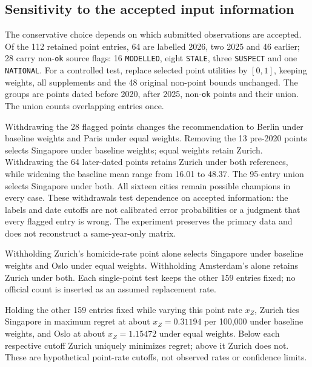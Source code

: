 \subsection{Sensitivity to the accepted input information}\label{sec:sourcepolicy}
The conservative choice depends on which submitted observations are accepted.
Of the 112 retained point entries, 64 are labelled 2026, two 2025 and 46 earlier;
28 carry non-\texttt{ok} source flags: 16 \texttt{MODELLED}, eight \texttt{STALE},
three \texttt{SUSPECT} and one \texttt{NATIONAL}.
For a controlled test, replace selected point utilities by $[0,1]$, keeping
weights, all supplements and the 48 original non-point bounds unchanged.
The groups are points dated before 2020, after 2025, non-\texttt{ok} points and
their union. The union counts overlapping entries once.



Withdrawing the 28 flagged points changes the recommendation to Berlin under
baseline weights and Paris under equal weights. Removing the 13 pre-2020 points
selects Singapore under baseline weights; equal weights retain Zurich.
Withdrawing the 64 later-dated points retains Zurich under both references,
while widening the baseline mean range from 16.01 to 48.37. The 95-entry union
selects Singapore under both. All sixteen cities remain possible champions
in every case. These withdrawals test dependence on accepted information:
the labels and date cutoffs are not calibrated error probabilities or a
judgment that every flagged entry is wrong. The experiment preserves the
primary data and does not reconstruct a same-year-only matrix.

Withholding Zurich's homicide-rate point alone selects Singapore under baseline
weights and Oslo under equal weights. Withholding Amsterdam's alone retains
Zurich under both. Each single-point test keeps the other 159 entries fixed;
no official count is inserted as an assumed replacement rate.

Holding the other 159 entries fixed while varying this point rate $x_Z$, Zurich ties Singapore in maximum regret at about $x_Z=0.31194$ per 100,000 under baseline weights, and Oslo at about $x_Z=1.15472$ under equal weights. Below each respective cutoff Zurich uniquely minimizes regret; above it Zurich does not. These are hypothetical point-rate cutoffs, not observed rates or confidence limits.
